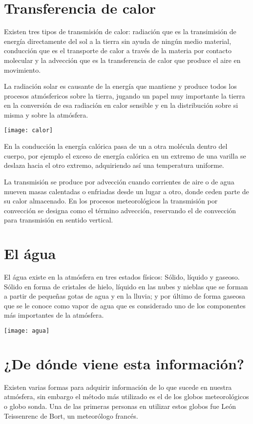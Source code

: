 \documentclass[12pt,letterpaper]{article}
\begin{document}
\begin{portada}
\section {Transferencia de calor}
Existen tres tipos de transmisión de calor: radiación que es la transimisión de energía directamente del sol a la tierra sin ayuda de ningún medio material, conducción que es el transporte de calor a través de la materia por contacto molecular y la advección que es la transferencia de calor que produce el aire en movimiento.

La radiación solar es causante de la energía que mantiene y produce todos los procesos atmósfericos sobre la tierra, jugando un papel muy importante la tierra en la conversión de esa radiación en calor sensible y en la distribución sobre si misma y sobre la atmósfera.
\begin{center}
\texttt{[image: calor]}
\end{center}

En la conducción la energía calórica pasa de un a otra molécula dentro del cuerpo, por ejemplo el exceso de energía calórica en un extremo de una varilla se deslaza hacia el otro extremo, adquiriendo así una temperatura uniforme.

La transmisión se produce por advección cuando corrientes de aire o de agua mueven masas calentadas o enfriadas desde un lugar a otro, donde ceden parte de su calor almacenado. En los procesos meteorológicos la transmisión por convección se designa como el término advección, reservando el de convección para transmisión en sentido vertical.
\section {El água}
El água existe en la atmósfera en tres estados físicos: Sólido, líquido y gaseoso. Sólido en forma de cristales de hielo, líquido en las nubes y nieblas que se forman a partir de pequeñas gotas de agua y en la lluvia; y por último de forma gaseosa que se le conoce como vapor de agua que es considerado uno de los componentes más importantes de la atmósfera. 
\begin{center}
\texttt{[image: agua]}
\end{center}
\section{¿De dónde viene esta información?}
Existen varias formas para adquirir información de lo que sucede en nuestra atmósfera, sin embargo el método más utilizado es el de los globos meteorológicos o globo sonda. Una de las primeras personas en utilizar estos globos fue León Teissenrenc de Bort, un meteorólogo francés.


\end{portada}
\end{document}
